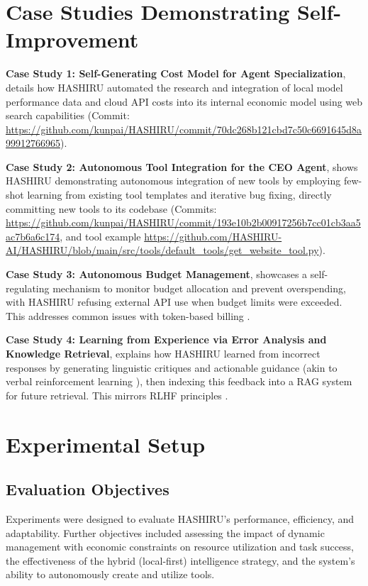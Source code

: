 \documentclass[twocolumn]{article}
\begin{document}
\section{Case Studies Demonstrating Self-Improvement}
\textbf{Case Study 1: Self-Generating Cost Model for Agent Specialization}, details how HASHIRU automated the research and integration of local model performance data and cloud API costs into its internal economic model using web search capabilities (Commit: \url{https://github.com/kunpai/HASHIRU/commit/70dc268b121cbd7c50c6691645d8a99912766965}).

\noindent\textbf{Case Study 2: Autonomous Tool Integration for the CEO Agent}, shows HASHIRU demonstrating autonomous integration of new tools by employing few-shot learning from existing tool templates and iterative bug fixing, directly committing new tools to its codebase (Commits: \url{https://github.com/kunpai/HASHIRU/commit/193e10b2b00917256b7cc01cb3aa5ac7b6a6c174}, and tool example \url{https://github.com/HASHIRU-AI/HASHIRU/blob/main/src/tools/default_tools/get_website_tool.py}).

\noindent\textbf{Case Study 3: Autonomous Budget Management}, showcases a self-regulating mechanism to monitor budget allocation and prevent overspending, with HASHIRU refusing external API use when budget limits were exceeded. This addresses common issues with token-based billing \cite{gemini_reddit, openai_sos, openai_costs}.

\noindent\textbf{Case Study 4: Learning from Experience via Error Analysis and Knowledge Retrieval}, explains how HASHIRU learned from incorrect responses by generating linguistic critiques and actionable guidance (akin to verbal reinforcement learning \cite{shinn2023reflexion}), then indexing this feedback into a RAG system \cite{lewis2021retrievalaugmentedgenerationknowledgeintensivenlp} for future retrieval. This mirrors RLHF principles \cite{ziegler2019fine, ouyang2022training}.

\section{Experimental Setup}

\subsection{Evaluation Objectives}
Experiments were designed to evaluate HASHIRU's performance, efficiency, and adaptability. Further objectives included assessing the impact of dynamic management with economic constraints on resource utilization and task success, the effectiveness of the hybrid (local-first) intelligence strategy, and the system's ability to autonomously create and utilize tools.
\end{document}
